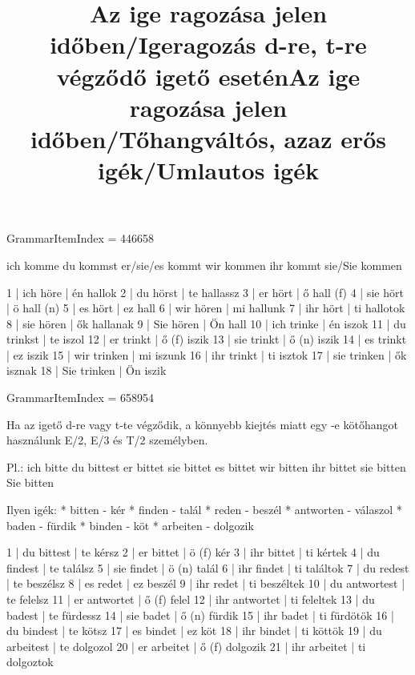 GrammarItemIndex = 446658

\begin{desc}
ich komme
du kommst
er/sie/es kommt
wir kommen
ihr kommt
sie/Sie kommen
\end{desc}

\begin{exmp}
1 | ich höre | én hallok
2 | du hörst | te hallassz
3 | er hört | ő hall (f)
4 | sie hört | ö hall (n)
5 | es hört | ez hall
6 | wir hören | mi hallunk
7 | ihr hört | ti hallotok
8 | sie hören | ők hallanak
9 | Sie hören | Ön hall
10 | ich trinke | én iszok
11 | du trinkst | te iszol
12 | er trinkt | ő (f) iszik
13 | sie trinkt | ő (n) iszik
14 | es trinkt | ez iszik
15 | wir trinken | mi iszunk
16 | ihr trinkt | ti isztok
17 | sie trinken | ők isznak
18 | Sie trinken | Ön iszik
\end{exmp}

\title{Az ige ragozása jelen időben/Igeragozás d-re, t-re végződő igető esetén}

GrammarItemIndex = 658954

\begin{desc}
Ha az igető d-re vagy t-te végződik, a könnyebb kiejtés miatt egy -e
kötőhangot használunk E/2, E/3 és T/2 személyben.

Pl.:
ich bitte
du bittest
er bittet
sie bittet
es bittet
wir bitten
ihr bittet
sie bitten
Sie bitten

Ilyen igék:
* bitten - kér
* finden - talál
* reden - beszél
* antworten - válaszol
* baden - fürdik
* binden - köt
* arbeiten - dolgozik
\end{desc}

\begin{exmp}
1 | du bittest | te kérsz
2 | er bittet | ö (f) kér
3 | ihr bittet | ti kértek
4 | du findest | te találsz
5 | sie findet | ö (n) talál
6 | ihr findet | ti találtok
7 | du redest | te beszélsz
8 | es redet | ez beszél
9 | ihr redet | ti beszéltek
10 | du antwortest | te felelsz
11 | er antwortet | ő (f) felel
12 | ihr antwortet | ti feleltek
13 | du badest | te fürdessz
14 | sie badet | ő (n) fürdik
15 | ihr badet | ti fürdötök
16 | du bindest | te kötsz
17 | es bindet | ez köt
18 | ihr bindet | ti köttök
19 | du arbeitest | te dolgozol
20 | er arbeitet | ő (f) dolgozik
21 | ihr arbeitet | ti dolgoztok
\end{exmp}

\title{Az ige ragozása jelen időben/Tőhangváltós, azaz erős igék/Umlautos igék}

